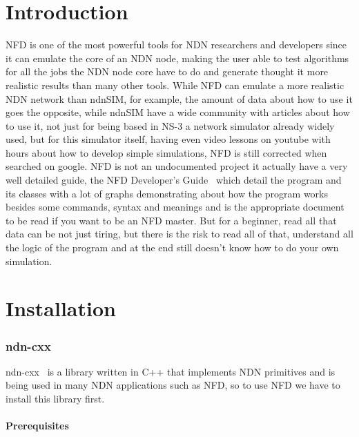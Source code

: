 \documentclass[10pt,letterpaper,extrafontsizes]{memoir}
\begin{document}
\chapter{Introduction}
NFD is one of the most powerful tools for NDN researchers and developers since it can emulate the core of an NDN node, making the user able to test algorithms for all the jobs the NDN node core have to do and generate thought it more realistic results than many other tools. While NFD can emulate a more realistic NDN network than ndnSIM, for example, the amount of data about how to use it goes the opposite, while ndnSIM have a wide community with articles about how to use it, not just for being based in NS-3 a network simulator already widely used, but for this simulator itself, having even video lessons on youtube with hours about how to develop simple simulations, NFD is still corrected when searched on google.
NFD is not an undocumented project it actually have a very well detailed guide, the NFD Developer’s Guide~\cite{devguide} which detail the program and its classes with a lot of graphs demonstrating about how the program works besides some commands, syntax and meanings and is the appropriate document to be read if you want to be an NFD master. But for a beginner, read all that data can be not just tiring, but there is the risk to read all of that, understand all the logic of the program and at the end still doesn't know how to do your own simulation.  

\chapter{Installation}
\subsection{ndn-cxx}
	ndn-cxx~\cite{ndncxx} is a library written in C++ that implements NDN primitives and is being used in many NDN applications such as NFD, so to use NFD we have to install this library first.
	\subsubsection{Prerequisites}
	
\end{document}
